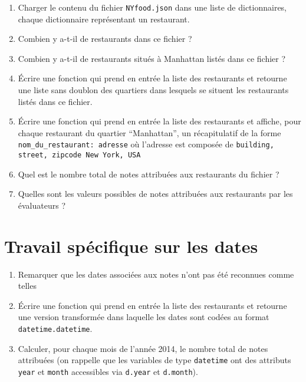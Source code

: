 \documentclass[11pt,a4paper]{article}
\begin{document}
\begin{enumerate}
\item Charger le contenu du fichier \verb+NYfood.json+ dans une liste de dictionnaires, chaque dictionnaire représentant un restaurant.

\item Combien y a-t-il de restaurants dans ce fichier ?

\item Combien y a-t-il de restaurants situés à Manhattan listés dans ce fichier ?

\item Écrire une fonction qui prend en entrée la liste des restaurants et retourne une liste sans doublon des quartiers dans lesquels se situent les restaurants listés dans ce fichier.

\item Écrire une fonction qui prend en entrée la liste des restaurants et affiche, pour chaque restaurant du quartier ``Manhattan'', un récapitulatif de la forme \verb+nom_du_restaurant: adresse+ où l'adresse est composée de \verb+building, street, zipcode New York, USA+

\item Quel est le nombre total de notes attribuées aux restaurants du fichier ?

\item Quelles sont les valeurs possibles de notes attribuées aux restaurants par les évaluateurs ?
\end{enumerate}

\section{Travail spécifique sur les dates}

\begin{enumerate}
    \item Remarquer que les dates associées aux notes n'ont pas été reconnues comme telles
    \item Écrire une fonction qui prend en entrée la liste des restaurants et retourne une version transformée dans laquelle les dates sont codées au format \verb+datetime.datetime+.
    \item Calculer, pour chaque mois de l'année 2014, le nombre total de notes attribuées (on rappelle que les variables de type \verb+datetime+ ont des attributs \verb+year+ et \verb+month+ accessibles via \verb+d.year+ et \verb+d.month+).
\end{enumerate}
\end{document}
